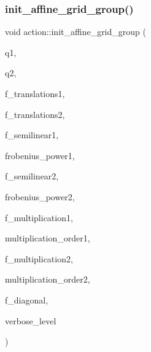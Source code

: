 \subsubsection{\texorpdfstring{init\+\_\+affine\+\_\+grid\+\_\+group()}{init\_affine\_grid\_group()}}
{\footnotesize\ttfamily void action\+::init\+\_\+affine\+\_\+grid\+\_\+group (\begin{DoxyParamCaption}\item[{\mbox{\hyperlink{galois_8h_a09fddde158a3a20bd2dcadb609de11dc}{I\+NT}}}]{q1,  }\item[{\mbox{\hyperlink{galois_8h_a09fddde158a3a20bd2dcadb609de11dc}{I\+NT}}}]{q2,  }\item[{\mbox{\hyperlink{galois_8h_a09fddde158a3a20bd2dcadb609de11dc}{I\+NT}}}]{f\+\_\+translations1,  }\item[{\mbox{\hyperlink{galois_8h_a09fddde158a3a20bd2dcadb609de11dc}{I\+NT}}}]{f\+\_\+translations2,  }\item[{\mbox{\hyperlink{galois_8h_a09fddde158a3a20bd2dcadb609de11dc}{I\+NT}}}]{f\+\_\+semilinear1,  }\item[{\mbox{\hyperlink{galois_8h_a09fddde158a3a20bd2dcadb609de11dc}{I\+NT}}}]{frobenius\+\_\+power1,  }\item[{\mbox{\hyperlink{galois_8h_a09fddde158a3a20bd2dcadb609de11dc}{I\+NT}}}]{f\+\_\+semilinear2,  }\item[{\mbox{\hyperlink{galois_8h_a09fddde158a3a20bd2dcadb609de11dc}{I\+NT}}}]{frobenius\+\_\+power2,  }\item[{\mbox{\hyperlink{galois_8h_a09fddde158a3a20bd2dcadb609de11dc}{I\+NT}}}]{f\+\_\+multiplication1,  }\item[{\mbox{\hyperlink{galois_8h_a09fddde158a3a20bd2dcadb609de11dc}{I\+NT}}}]{multiplication\+\_\+order1,  }\item[{\mbox{\hyperlink{galois_8h_a09fddde158a3a20bd2dcadb609de11dc}{I\+NT}}}]{f\+\_\+multiplication2,  }\item[{\mbox{\hyperlink{galois_8h_a09fddde158a3a20bd2dcadb609de11dc}{I\+NT}}}]{multiplication\+\_\+order2,  }\item[{\mbox{\hyperlink{galois_8h_a09fddde158a3a20bd2dcadb609de11dc}{I\+NT}}}]{f\+\_\+diagonal,  }\item[{\mbox{\hyperlink{galois_8h_a09fddde158a3a20bd2dcadb609de11dc}{I\+NT}}}]{verbose\+\_\+level }\end{DoxyParamCaption})}

\mbox{\label{classaction_a32c0c683b3071fef19d28ca4880b568a}} 
